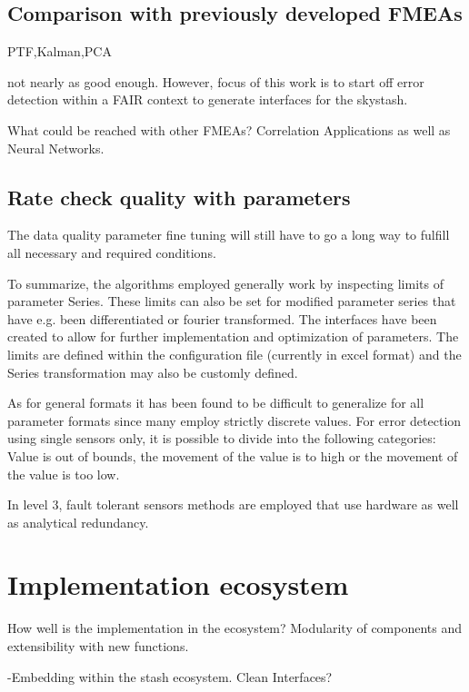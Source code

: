 \subsection{Comparison with previously developed FMEAs}
PTF,Kalman,PCA

not nearly as good enough. However, focus of this work is to start off error detection within a FAIR context to generate interfaces for the skystash.

What could be reached with other FMEAs? Correlation Applications as well as Neural Networks.


\subsection{Rate check quality with parameters}
The data quality parameter fine tuning will still have to go a long way to fulfill all necessary and required conditions.

To summarize, the algorithms employed generally work by inspecting limits of parameter Series. These limits can also be set for modified parameter series that have e.g. been differentiated or fourier transformed. The interfaces have been created to allow for further implementation and optimization of parameters. The limits are defined within the configuration file (currently in excel format) and the Series transformation may also be customly defined.

As for general formats it has been found to be difficult to generalize for all parameter formats since many employ strictly discrete values. For error detection using single sensors only, it is possible to divide into the following categories: Value is out of bounds, the movement of the value is to high or the movement of the value is too low.

In level 3, fault tolerant sensors methods are employed that use hardware as well as analytical redundancy. \cite[p.355-365]{isermann_fault-diagnosis_2006}





\section{Implementation ecosystem}

How well is the implementation in the ecosystem? Modularity of components and extensibility with new functions.


-Embedding within the stash ecosystem. Clean Interfaces?



